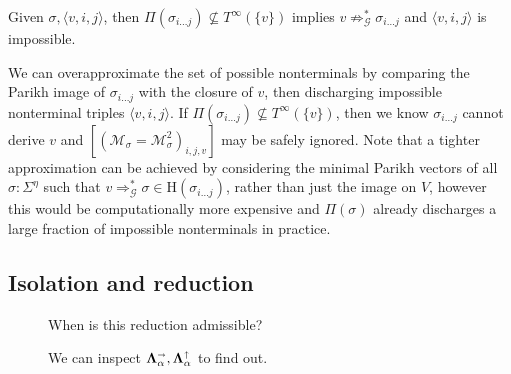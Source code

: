 \documentclass[sigplan,review,anonymous,acmsmall]{acmart}\settopmatter{printfolios=false,printccs=false,printacmref=false}
\begin{document}
\begin{lemma}
Given $\sigma, \langle v, i, j \rangle$, then $\Pi(\sigma_{i\ldots j}) \not\subseteq T^\infty(\{v\})$ implies $v\not\Rightarrow^*_\mathcal{G} \sigma_{i\ldots j}$ and $\langle v, i, j \rangle$ is impossible.
\end{lemma}

We can overapproximate the set of possible nonterminals by comparing the Parikh image of $\sigma_{i\ldots j}$ with the closure of $v$, then discharging impossible nonterminal triples $\langle v, i, j \rangle$. If $\Pi(\sigma_{i\ldots j}) \not\subseteq T^\infty(\{v\})$, then we know $\sigma_{i\ldots j}$ cannot derive $v$ and $\left[(\mathcal{M}_{\sigma} = \mathcal{M}_{\sigma}^2)_{i, j, v}\right]$ may be safely ignored. Note that a tighter approximation can be achieved by considering the minimal Parikh vectors of all $\sigma: \Sigma^\eta$ such that $v \Rightarrow_\mathcal{G}^* \sigma \in \text{H}(\sigma_{i\ldots j})$, rather than just the image on $V$, however this would be computationally more expensive and $\Pi(\sigma)$ already discharges a large fraction of impossible nonterminals in practice.

\subsection{Isolation and reduction}

\newcommand{\ddd}{\Ddots}
\newcommand{\vdd}{\Vdots}
\newcommand{\cdd}{\Cdots}
\newcommand{\lds}{\ldots}
\newcommand{\vno}{\varnothing}
\newcommand{\ts}[1]{\textsuperscript{#1}}
\newcommand{\non}{1\ts{st}}
\newcommand{\ntw}{2\ts{nd}}
\newcommand{\nth}{3\ts{rd}}
\newcommand{\nfo}{4\ts{th}}
\newcommand{\nfi}{5\ts{th}}
\newcommand{\nsi}{6\ts{th}}
\newcommand{\nse}{7\ts{th}}
\newcommand{\vs}[1]{\sigma_{#1}^{\shur}}
\newcommand{\gs}[1]{\gamma_{#1}^{\shur}}
\newcommand{\bs}[1]{\beta_{#1}^{\shur}}
\newcommand{\qs}[1]{\alpha_{#1}^{\shur}}
\newcommand{\rcr}{\rowcolor{black!15}}
\newcommand{\rcw}{\rowcolor{white}}
\newcommand{\pcd}{\cdot}
\newcommand{\pcp}{\phantom\cdot}
\newcommand{\ppp}{\phantom{\nse}}
\newcommand{\hhg}[1]{\tikz[overlay]\node[rectangle,fill=black!15,draw=none,text opacity =1] {$#1$};}

\begin{wrapfigure}{r}{0.4\textwidth}
  \vspace{-20pt}
  \resizebox{0.4\textwidth}{!}{}
  \caption{When is this reduction admissible?}\label{fig:mat_simpl}
  \begin{center}\resizebox{0.35\textwidth}{!}{}\end{center}
  \caption{We can inspect $\bm\Lambda_\alpha^\shortrightarrow, \bm\Lambda_\alpha^\shortuparrow$ to find out.}
\end{wrapfigure}
\end{document}

